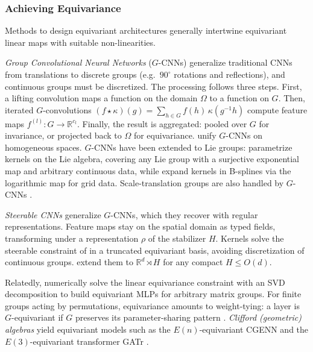 \documentclass[mathematics,review,submit,moreauthors]{Definitions/mdpi}
\begin{document}
\subsubsection{Achieving Equivariance}\label{sec:edl-achieving-equiv}

Methods to design equivariant architectures generally intertwine equivariant linear maps with suitable non-linearities.

\emph{Group Convolutional Neural Networks} ($G$-CNNs) \citep{cohen2016} generalize traditional CNNs from translations to discrete groups (e.g.\ $90^\circ$ rotations and reflections), and continuous groups must be discretized.
The processing follows three steps.
First, a lifting convolution maps a function on the domain $\Omega$ to a function on $G$.
Then, iterated $G$-convolutions $(f\star\kappa)(g)=\sum_{h\in G}f(h)\,\kappa(g^{-1}h)$ compute feature maps $f^{(l)}:G\to\mathbb{R}^{c_l}$.
Finally, the result is aggregated: pooled over $G$ for invariance, or projected back to $\Omega$ for equivariance.
\citet{cohen2019anips} unify $G$-CNNs on homogeneous spaces.
$G$-CNNs have been extended to Lie groups: \citet{finzi2020p3icml} parametrize kernels on the Lie algebra, covering any Lie group with a surjective exponential map and arbitrary continuous data, while \citet{bekkers2021} expand kernels in B-splines via the logarithmic map for grid data.
Scale-translation groups are also handled by $G$-CNNs \citep{sosnovik2020,romero2023tmlr}.

\emph{Steerable CNNs} \citep{cohen2016a} generalize $G$-CNNs, which they recover with regular representations.
Feature maps stay on the spatial domain as typed fields, transforming under a representation $\rho$ of the stabilizer $H$.
Kernels solve the steerable constraint of  in a truncated equivariant basis, avoiding discretization of continuous groups.
\citet{cesa2021} extend them to $\mathbb{R}^d\rtimes H$ for any compact $H\le O(d)$.

Relatedly, \citet{finzi2021p3icml} numerically solve the linear equivariance constraint with an SVD decomposition to build equivariant MLPs for arbitrary matrix groups.
For finite groups acting by permutations, equivariance amounts to weight-tying: a layer is $G$-equivariant if $G$ preserves its parameter-sharing pattern \citep{ravanbakhsh2017p3icml}.
\emph{Clifford (geometric) algebras} yield equivariant models such as the $E(n)$-equivariant CGENN \citep{ruhe2023} and the $E(3)$-equivariant transformer GATr \citep{brehmer2023}.
\end{document}
